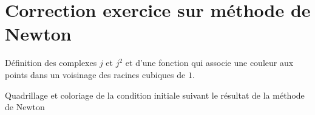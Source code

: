 \section{Correction exercice sur méthode de Newton}
Définition des complexes $j$ et $j^2$ et d'une fonction qui associe une couleur aux points dans un voisinage des racines cubiques de $1$.

Quadrillage et coloriage de la condition initiale suivant le résultat de la méthode de Newton



